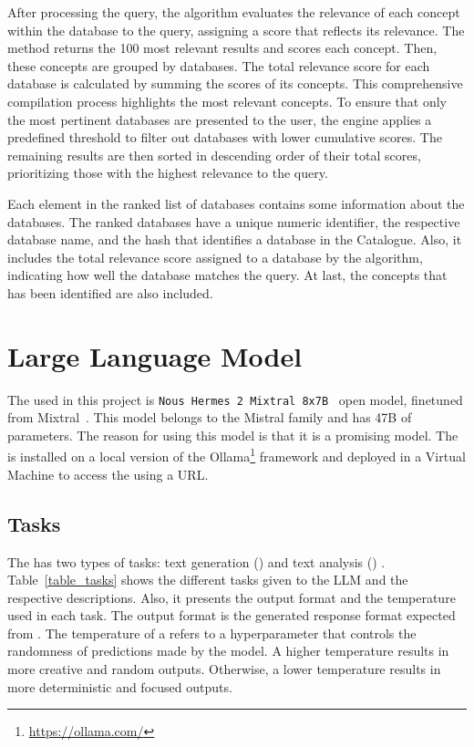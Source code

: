 After processing the query, the {\bm} algorithm evaluates the relevance of each concept within the database to the query, assigning a score that reflects its relevance. The method returns the 100 most relevant results and scores each concept. Then, these concepts are grouped by databases. The total relevance score for each database is calculated by summing the scores of its concepts. This comprehensive compilation process highlights the most relevant concepts. To ensure that only the most pertinent databases are presented to the user, the engine applies a predefined threshold to filter out databases with lower cumulative scores. The remaining results are then sorted in descending order of their total scores, prioritizing those with the highest relevance to the query.

Each element in the ranked list of databases contains some information about the databases. The ranked databases have a unique numeric identifier, the respective database name, and the hash that identifies a database in the {\ehden} Catalogue. Also, it includes the total relevance score assigned to a database by the {\bm} algorithm, indicating how well the database matches the query. At last, the concepts that has been identified are also included.



\section{Large Language Model}
\label{sec:llm}

The {\llm} used in this project is \texttt{Nous Hermes 2 Mixtral 8x7B}~\cite{Nous-Hermes-2-Mixtral-8x7B-DPO} open model, finetuned from Mixtral~\cite{jiang_mixtral_2024}. This model belongs to the Mistral family and has 47B of parameters. The reason for using this {\llm} model is that it is a promising model. The {\llm} is installed on a local version of the Ollama\footnote{\url{https://ollama.com/}} framework and deployed in a Virtual Machine to access the {\llm} using a URL.


\subsection{Tasks}

The {\llm} has two types of tasks: text generation ({\nlg}) and text analysis ({\nlu}) . Table~\ref{table_tasks} shows the different tasks given to the LLM and the respective descriptions. Also, it presents the output format and the temperature used in each task. The output format is the generated response format expected from {\llm}. The temperature of a {\llm} refers to a hyperparameter that controls the randomness of predictions made by the model. A higher temperature results in more creative and random outputs. Otherwise, a lower temperature results in more deterministic and focused outputs.

